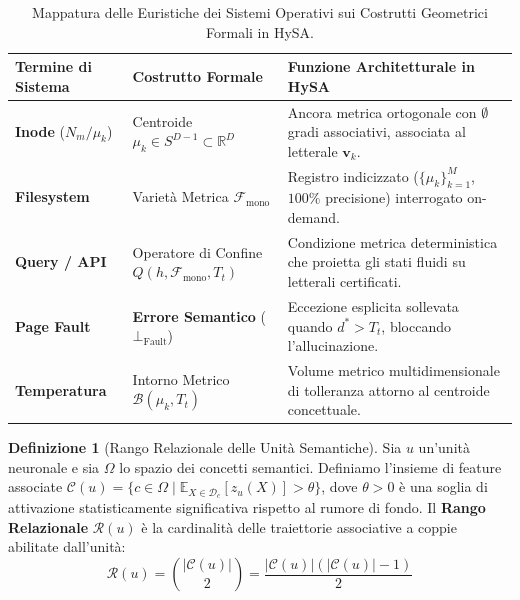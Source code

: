 \documentclass[11pt,a4paper]{article}
\theoremstyle{definition}
\newtheorem{definizione}{Definizione}
\begin{document}
\begin{table}[t]
\centering
\caption{Mappatura delle Euristiche dei Sistemi Operativi sui Costrutti Geometrici Formali in HySA.}
\label{tab:systems_mapping}
\vspace{0.15cm}
\small
\setlength{\tabcolsep}{4.0pt}
\begin{tabular}{@{}p{3.2cm}p{3.8cm}p{8.5cm}@{}}
\toprule
\textbf{Termine di Sistema} & \textbf{Costrutto Formale} & \textbf{Funzione Architetturale in HySA} \\ \midrule
\textbf{Inode} ($N_m / \mu_k$) & Centroide $\mu_k \in S^{D-1} \subset \mathbb{R}^D$ & Ancora metrica ortogonale con $\emptyset$ gradi associativi, associata al letterale $\mathbf{v}_k$. \\[4pt]
\textbf{Filesystem} & Varietà Metrica $\mathcal{F}_{\mathrm{mono}}$ & Registro indicizzato ($\{\mu_k\}_{k=1}^M$, $100\%$ precisione) interrogato on-demand. \\[4pt]
\textbf{Query / API} & Operatore di Confine $Q(h, \mathcal{F}_{\mathrm{mono}}, T_t)$ & Condizione metrica deterministica che proietta gli stati fluidi su letterali certificati. \\[4pt]
\textbf{Page Fault} & \textbf{Errore Semantico} ($\bot_{\mathrm{Fault}}$) & Eccezione esplicita sollevata quando $d^* > T_t$, bloccando l'allucinazione. \\[4pt]
\textbf{Temperatura} & Intorno Metrico $\mathcal{B}(\mu_k, T_t)$ & Volume metrico multidimensionale di tolleranza attorno al centroide concettuale. \\ \bottomrule
\end{tabular}
\end{table}

\begin{definizione}[Rango Relazionale delle Unità Semantiche]
Sia $u$ un'unità neuronale e sia $\Omega$ lo spazio dei concetti semantici. Definiamo l'insieme di feature associate $\mathcal{C}(u) = \{c \in \Omega \mid \mathbb{E}_{X \in \mathcal{D}_c}[z_u(X)] > \theta\}$, dove $\theta > 0$ è una soglia di attivazione statisticamente significativa rispetto al rumore di fondo. Il \textbf{Rango Relazionale} $\mathcal{R}(u)$ è la cardinalità delle traiettorie associative a coppie abilitate dall'unità:
\begin{equation}
    \mathcal{R}(u) = \binom{|\mathcal{C}(u)|}{2} = \frac{|\mathcal{C}(u)| (|\mathcal{C}(u)| - 1)}{2}
\end{equation}
\end{definizione}
\end{document}
